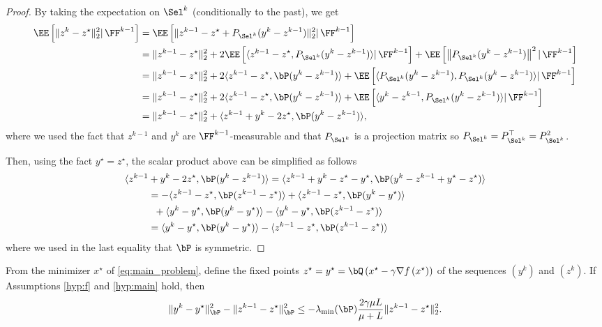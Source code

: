 \begin{proof}
By taking the expectation on $\Sel^k$ (conditionally to the past), we get 
\begin{align*}
\EE\left[\|z^{k} - z^\star\|_2^2|\,\FF^{k-1}\right]  &= \EE \left[\|z^{k-1} - z^\star + P_{\Sel^k}(y^k-z^{k-1}) \|_2^2 |\,\FF^{k-1}\right]\\
&= \|z^{k-1}-z^\star\|_2^2 + 2 \EE \left[  \langle z^{k-1}-z^\star, P_{\Sel^k}(y^k - z^{k-1} ) \rangle |\,\FF^{k-1}\right] + \EE \left[ \left\| P_{\Sel^k}(y^k-z^{k-1}) \right\|^2 |\,\FF^{k-1}\right] \\
&=\|z^{k-1}-z^\star\|_2^2 + 2\langle z^{k-1}-z^\star, \bP(y^k - z^{k-1} ) \rangle + \EE \left[\langle  P_{\Sel^k}(y^k-z^{k-1}), P_{\Sel^k} (y^k-z^{k-1})\rangle |\,\FF^{k-1}\right]\\
&=\|z^{k-1}-z^\star\|_2^2 + 2\langle z^{k-1}-z^\star, \bP(y^k - z^{k-1} ) \rangle + \EE \left[ \langle y^k-z^{k-1}, P_{\Sel^k} (y^k-z^{k-1})\rangle |\,\FF^{k-1}\right] \\
&= \|z^{k-1}-z^\star\|_2^2 + \langle z^{k-1} + y^k - 2 z^\star , \bP(y^k - z^{k-1} ) \rangle,
\end{align*}
where we used the fact that $z^{k-1}$ and $y^k$ are $\FF^{k-1}$-measurable and that $P_{\Sel^k}$ is a projection matrix so $P_{\Sel^k} = P_{\Sel^k}^\top = P_{\Sel^k}^2 $.

Then, using the fact $y^\star = z^\star$, the scalar product above can be simplified as follows
\begin{align*}
\nonumber\langle z^{k-1} &+ y^k - 2z^\star , \bP(y^k - z^{k-1}) \rangle = \langle z^{k-1} + y^k - z^\star - y^\star, \bP(y^k - z^{k-1} + y^\star -  z^\star ) \rangle \\
 \nonumber
 &=  - \langle z^{k-1}  - z^\star, \bP(z^{k-1} - z^\star) \rangle + \langle z^{k-1} - z^\star, \bP(y^k - y^\star) \rangle\\
 \nonumber
&\hspace*{0.2cm} + \langle y^k  - y^\star, \bP(y^k - y^\star) \rangle - \langle y^k - y^\star, \bP(z^{k-1} - z^\star) \rangle\\
&=  \langle y^k  - y^\star, \bP(y^k - y^\star) \rangle - \langle z^{k-1}  - z^\star, \bP(z^{k-1} - z^\star) \rangle
\end{align*}
where we used in the last equality that $\bP$ is symmetric.
\hfill
\end{proof}



\begin{lemma}\label{lm:bub}
From the minimizer  $x^\star$  of \eqref{eq:main_problem}, define the fixed points $z^\star = y^\star = \bQ\left(x^\star - \gamma\nabla f\left(x^\star\right)\right)$ of the sequences $(y^k)$ and $(z^k)$. 
If Assumptions \ref{hyp:f} and \ref{hyp:main} hold, then
    \begin{equation*}
\|y^{k}-y^\star\|_{\bP}^2 -  \|z^{k-1}-z^\star\|_{\bP}^2 \leq - \lambda_{\min}(\bP) \frac{2\gamma\mu L}{\mu + L}\|z^{k-1} - z^\star\|_2^2.
\end{equation*}
\end{lemma}


